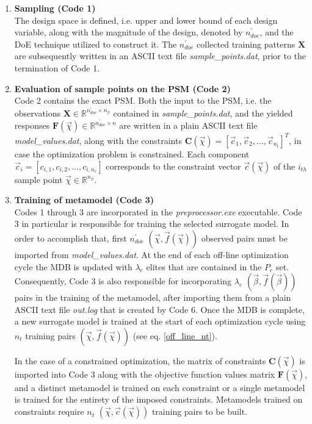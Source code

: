 \begin{enumerate}
\item \textbf{Sampling (Code 1)} \\ 
The design space is defined, i.e. upper and lower bound 
of each design variable, along with the magnitude of the design, 
denoted by $n_{doe}^{'}$, and the DoE technique utilized to 
construct it. The $n_{doe}^{'}$ collected training patterns 
$\mathbf{X}$ are subsequently written in an ASCII text file 
\textit{sample\_points.dat}, prior to the termination of Code 1. 
 
\item \textbf{Evaluation of sample points on the PSM (Code 2)} \\
Code 2 contains the exact PSM. Both the input to the PSM, i.e. 
the observations $\mathbf{X} \! \in \!\mathbb{R}^{n_{doe}^{'} 
\times n_{β}}$ contained in \textit{sample\_points.dat}, and the 
yielded responses $\mathbf{F}(\vec{χ}) \!\in \!\mathbb{R}^{n_{doe}
^{'} \times n}$ are written in a plain ASCII text file 
\textit{model\_values.dat}, along with the constraints $\mathbf{C}
(\vec{χ}) = [\vec{c}_{1}, \vec{c}_{2}, \hdots, \vec{c}
_{n_{t}}]^{T}$, in case the optimization problem is constrained. 
Each component $\vec{c}_{i} = [c_{i,1}, c_{i,2}, \hdots, 
c_{i,n_{c}}]$ corresponds to the constraint vector $\vec{c}
(\vec{χ})$ of the $i_{th}$ sample point $\vec{χ} \in \mathbb{R}
^{n_{β}}$.

\item \textbf{Training of metamodel (Code 3)} \\
Codes 1 through 3 are incorporated in the 
\textit{preprocessor.exe} executable. Code 3 in particular is 
responsible for training the selected surrogate model. In order 
to accomplish that, first $n_{doe}^{'}$ $(\vec{χ}, \vec{f}
(\vec{χ}))$ observed pairs must be imported from 
\textit{model\_values.dat}. At the end of each off-line 
optimization cycle the MDB is updated with $λ_{e}$ elites that 
are contained in the $P_{e}$ set. Consequently, Code 3 is also 
responsible for incorporating $λ_{e}$ $(\vec{β},\vec{f}(\vec{β}))$ 
pairs in the training of the metamodel, after importing them from 
a plain ASCII text file \textit{out.log} that is created by Code 
6. Once the MDB is complete, a new surrogate model is trained at 
the start of each optimization cycle using $n_{t}$ training pairs 
$(\vec{χ},\vec{f}(\vec{χ}))$ (see eq. \ref{off_line_nt}). 

In the case of a constrained optimization, 
the matrix of constraints $\mathbf{C}(\vec{χ})$ is imported 
into Code 3 along with the objective function values 
matrix $\mathbf{F}(\vec{χ})$, and a distinct metamodel is 
trained on each constraint or a single metamodel is trained 
for the entirety of the imposed constraints. Metamodels 
trained on constraints require $n_{t}$ $(\vec{χ},\vec{c}
(\vec{χ}))$ training pairs to be built. 


\end{enumerate}
